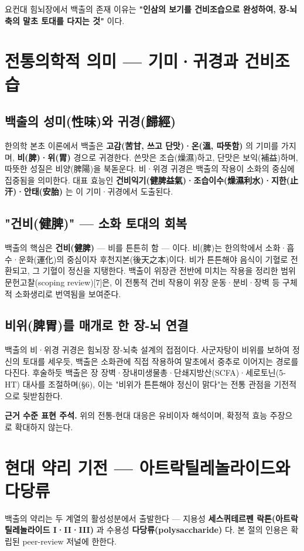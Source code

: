 \documentclass[11pt,oneside]{book}
\newenvironment{authnote}
  {\par\smallskip\begingroup\leftskip=7mm\rightskip=5mm\small\color{muted}\noindent\ignorespaces}
  {\par\endgroup\smallskip}
\begin{document}
요컨대 힘뇌장에서 백출의 존재 이유는 \textbf{"인삼의 보기를 건비조습으로 완성하여, 장-뇌축의 말초 토대를 다지는 것"} 이다.

\section{전통의학적 의미 — 기미·귀경과 건비조습}
\subsection{백출의 성미(性味)와 귀경(歸經)}
한의학 본초 이론에서 백출은 \textbf{고감(苦甘, 쓰고 단맛)·온(溫, 따뜻함)} 의 기미를 가지며, \textbf{비(脾)·위(胃)} 경으로 귀경한다. 쓴맛은 조습(燥濕)하고, 단맛은 보익(補益)하며, 따뜻한 성질은 비양(脾陽)을 북돋운다. 비·위경 귀경은 백출의 작용이 소화의 중심에 집중됨을 의미한다. 대표 효능인 \textbf{건비익기(健脾益氣)·조습이수(燥濕利水)·지한(止汗)·안태(安胎)} 는 이 기미·귀경에서 도출된다.

\subsection{"건비(健脾)" — 소화 토대의 회복}
백출의 핵심은 \textbf{건비(健脾)} — 비를 튼튼히 함 — 이다. 비(脾)는 한의학에서 소화·흡수·운화(運化)의 중심이자 후천지본(後天之本)이다. 비가 튼튼해야 음식이 기혈로 전환되고, 그 기혈이 정신을 지탱한다. 백출이 위장관 전반에 미치는 작용을 정리한 범위 문헌고찰(scoping review)[7]은, 이 전통적 건비 작용이 위장 운동·분비·장벽 등 구체적 소화생리로 번역됨을 보여준다.

\subsection{비위(脾胃)를 매개로 한 장-뇌 연결}
백출의 비·위경 귀경은 힘뇌장 장-뇌축 설계의 접점이다. 사군자탕이 비위를 보하여 정신의 토대를 세우듯, 백출은 소화관에 직접 작용하여 말초에서 중추로 이어지는 경로를 다진다. 후술하듯 백출은 장 장벽·장내미생물총·단쇄지방산(SCFA)·세로토닌(5-HT) 대사를 조절하며(§6), 이는 "비위가 튼튼해야 정신이 맑다"는 전통 관점을 기전적으로 뒷받침한다.

\begin{authnote}\textbf{근거 수준 표현 주석.} 위의 전통-현대 대응은 유비이자 해석이며, 확정적 효능 주장으로 확대하지 않는다.\end{authnote}
\section{현대 약리 기전 — 아트락틸레놀라이드와 다당류}
백출의 약리는 두 계열의 활성성분에서 출발한다 — 지용성 \textbf{세스퀴테르펜 락톤(아트락틸레놀라이드 I·II·III)} 과 수용성 \textbf{다당류(polysaccharide)} 다. 본 절의 인용은 확립된 peer-review 저널에 한한다.
\end{document}
